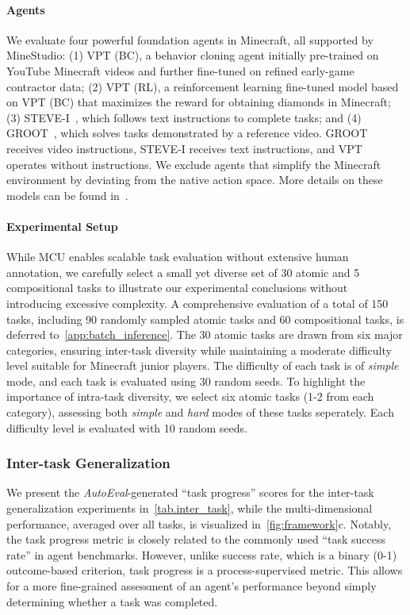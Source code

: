 \paragraph{Agents} We evaluate four powerful foundation agents in Minecraft, all supported by MineStudio: (1) VPT (BC), a behavior cloning agent initially pre-trained on YouTube Minecraft videos and further fine-tuned on refined early-game contractor data; (2) VPT (RL), a reinforcement learning fine-tuned model based on VPT (BC) that maximizes the reward for obtaining diamonds in Minecraft; (3) STEVE-I~\citep{steve1}, which follows text instructions to complete tasks; and (4) GROOT~\citep{groot}, which solves tasks demonstrated by a reference video.  GROOT receives video instructions, STEVE-I receives text instructions, and VPT operates without instructions. We exclude agents that simplify the Minecraft environment by deviating from the native action space.
More details on these models can be found in~\citet{groot}.

\paragraph{Experimental Setup} 
While MCU enables scalable task evaluation without extensive human annotation, we carefully select a small yet diverse set of 30 atomic and 5 compositional tasks to illustrate our experimental conclusions without introducing excessive complexity. A comprehensive evaluation of a total of 150 tasks, including 90 randomly sampled atomic tasks and 60 compositional tasks, is deferred to~\cref{app:batch_inference}.
The 30 atomic tasks are drawn from six major categories, ensuring inter-task diversity while maintaining a moderate difficulty level suitable for Minecraft junior players. The difficulty of each task is of \emph{simple} mode, and each task is evaluated using 30 random seeds.
To highlight the importance of intra-task diversity, we select six atomic tasks (1-2 from each category), assessing both \emph{simple} and \emph{hard} modes of these tasks seperately. Each difficulty level is evaluated with 10 random seeds.



\subsubsection{Inter-task Generalization}
We present the \emph{AutoEval}-generated ``task progress'' scores for the inter-task generalization experiments in~\cref{tab.inter_task}, while the multi-dimensional performance, averaged over all tasks, is visualized in~\cref{fig:framework}c. 
Notably, the task progress metric is closely related to the commonly used ``task success rate'' in agent benchmarks. However, unlike success rate, which is a binary (0-1) outcome-based criterion, task progress is a process-supervised metric. This allows for a more fine-grained assessment of an agent's performance beyond simply determining whether a task was completed.

